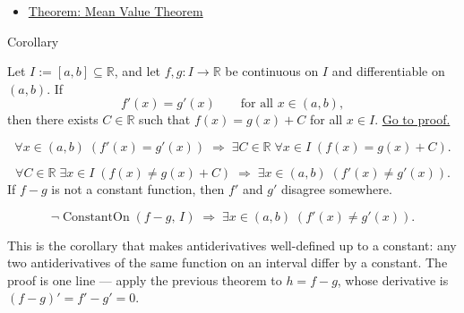 \begin{remark*}[Dependencies]
\begin{itemize}
  \item \hyperref[thm:mean-value-theorem]{Theorem: Mean Value Theorem}
\end{itemize}
\end{remark*}


\begin{corollarybox}{Corollary}
\begin{corollary}
\label{cor:equal-derivatives-constant-difference}
Let $I := [a,b] \subseteq \mathbb{R}$, and let $f, g : I \to \mathbb{R}$ be continuous on $I$ and differentiable on $(a,b)$. If
\[
f'(x) = g'(x) \qquad \text{for all } x \in (a,b),
\]
then there exists $C \in \mathbb{R}$ such that $f(x) = g(x) + C$ for all $x \in I$.
\hyperref[prf:equal-derivatives-constant-difference]{Go to proof.}
\end{corollary}
\end{corollarybox}

\begin{remark*}
\[
\forall x \in (a,b)\;(f'(x)=g'(x))
\;\Rightarrow\;
\exists C \in \mathbb{R}\;\forall x \in I\;(f(x)=g(x)+C).
\]
\end{remark*}

\begin{remark*}
\[
\forall C \in \mathbb{R}\;\exists x \in I\;(f(x) \neq g(x)+C)
\;\Rightarrow\;
\exists x \in (a,b)\;(f'(x) \neq g'(x)).
\]
If $f - g$ is not a constant function, then $f'$ and $g'$ disagree somewhere.
\end{remark*}

\begin{remark*}
\[
\lnot\operatorname{ConstantOn}(f-g,\,I) \;\Rightarrow\; \exists x\in(a,b)\;(f'(x)\neq g'(x)).
\]
\end{remark*}

\begin{remark*}[Interpretation]
This is the corollary that makes antiderivatives well-defined up to a constant: any two antiderivatives of the same function on an interval differ by a constant. The proof is one line --- apply the previous theorem to $h = f - g$, whose derivative is $(f-g)' = f'-g' = 0$.
\end{remark*}

